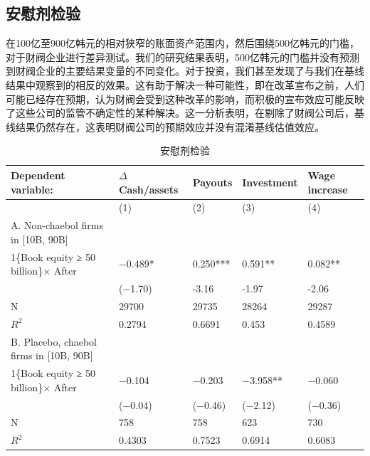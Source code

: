 \documentclass{article}
\begin{document}
\subsection{安慰剂检验}
在100亿至900亿韩元的相对狭窄的账面资产范围内，然后围绕500亿韩元的门槛，对于财阀企业进行差异测试。我们的研究结果表明，500亿韩元的门槛并没有预测到财阀企业的主要结果变量的不同变化。对于投资，我们甚至发现了与我们在基线结果中观察到的相反的效果。这有助于解决一种可能性，即在改革宣布之前，人们可能已经存在预期，认为财阀会受到这种改革的影响，而积极的宣布效应可能反映了这些公司的监管不确定性的某种解决。这一分析表明，在剔除了财阀公司后，基线结果仍然存在，这表明财阀公司的预期效应并没有混淆基线估值效应。

\begin{table}[H]
\caption{安慰剂检验}
\centering
\small
\begin{tabularx}{\textwidth}{lXXXX}
\toprule
Dependent variable:                           & $\Delta$ Cash/assets & Payouts  & Investment & Wage increase \\ \midrule
                                              & (1)          & (2)      & (3)        & (4)           \\ \midrule
A.   Non-chaebol firms in {[}10B, 90B{]}      &              &          &            &               \\ \midrule
1\{Book equity   ≥ 50 billion\}× After        & −0.489*      & 0.250*** & 0.591**    & 0.082**       \\
                                              & (−1.70)      & -3.16    & -1.97      & -2.06         \\
N                                             & 29700        & 29735    & 28264      & 29287         \\
$R^2$                                            & 0.2794       & 0.6691   & 0.453      & 0.4589        \\ \midrule
B. Placebo,   chaebol firms in {[}10B, 90B{]} &              &          &            &               \\ \midrule
1\{Book equity   ≥ 50 billion\}× After        & −0.104       & −0.203   & −3.958**   & −0.060        \\
                                              & (−0.04)      & (−0.46)  & (−2.12)    & (−0.36)       \\
N                                             & 758          & 758      & 623        & 730           \\
$R^2$                                            & 0.4303       & 0.7523   & 0.6914     & 0.6083        \\ \midrule

\end{tabularx}
\end{table}
\end{document}
